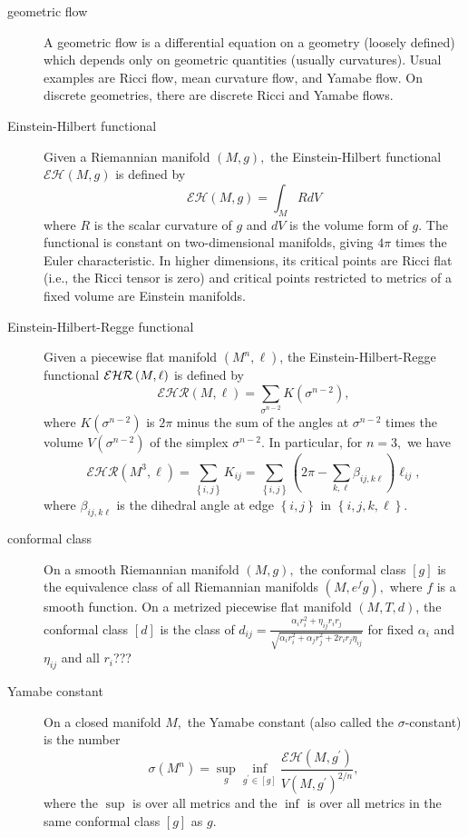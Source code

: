 \begin{description}
\item[geometric flow] A geometric flow is a differential equation on a
geometry (loosely defined) which depends only on geometric quantities
(usually curvatures). Usual examples are Ricci flow, mean curvature flow,
and Yamabe flow. On discrete geometries, there are discrete Ricci and Yamabe
flows.

\item[Einstein-Hilbert functional] Given a Riemannian manifold $\left(
M,g\right) ,$ the Einstein-Hilbert functional $\mathcal{EH}\left( M,g\right) 
$ is defined by 
\[
\mathcal{EH}\left( M,g\right) =\int_{M}RdV 
\]%
where $R$ is the scalar curvature of $g$ and $dV$ is the volume form of $g.$
The functional is constant on two-dimensional manifolds, giving $4\pi $
times the Euler characteristic. In higher dimensions, its critical points
are Ricci flat (i.e., the Ricci tensor is zero) and critical points
restricted to metrics of a fixed volume are Einstein manifolds.

\item[Einstein-Hilbert-Regge functional] Given a piecewise flat manifold $%
\left( M^{n},\ell \right) $, the Einstein-Hilbert-Regge functional $\mathcal{%
EHR}\left( M,\ell \right) $ is defined by 
\[
\mathcal{EHR}\left( M,\ell \right) =\sum_{\sigma ^{n-2}}K\left( \sigma
^{n-2}\right) , 
\]%
where $K\left( \sigma ^{n-2}\right) $ is $2\pi $ minus the sum of the angles
at $\sigma ^{n-2}$ times the volume $V\left( \sigma ^{n-2}\right) $ of the
simplex $\sigma ^{n-2}.$ In particular, for $n=3,$ we have 
\[
\mathcal{EHR}\left( M^{3},\ell \right) =\sum_{\left\{ i,j\right\}
}K_{ij}=\sum_{\left\{ i,j\right\} }\left( 2\pi -\sum_{k,\ell }\beta
_{ij,k\ell }\right) \ell _{ij}, 
\]%
where $\beta _{ij,k\ell }$ is the dihedral angle at edge $\left\{
i,j\right\} $ in $\left\{ i,j,k,\ell \right\} .$

\item[conformal class] On a smooth Riemannian manifold $\left( M,g\right) ,$
the conformal class $\left[ g\right] $ is the equivalence class of all
Riemannian manifolds $\left( M,e^{f}g\right) ,$ where $f$ is a smooth
function. On a metrized piecewise flat manifold $\left( M,T,d\right) $, the
conformal class $\left[ d\right] $ is the class of $d_{ij}=\frac{\alpha
_{i}r_{i}^{2}+\eta _{ij}r_{i}r_{j}}{\sqrt{\alpha _{i}r_{i}^{2}+\alpha
_{j}r_{j}^{2}+2r_{i}r_{j}\eta _{ij}}}$ for fixed $\alpha _{i}$ and $\eta
_{ij}$ and all $r_{i}$???

\item[Yamabe constant] On a closed manifold $M,$ the Yamabe constant (also
called the $\sigma $-constant) is the number 
\[
\sigma \left( M^{n}\right) =\sup_{g}\inf_{g^{\prime }\in \left[ g\right] }%
\frac{\mathcal{EH}\left( M,g^{\prime }\right) }{V\left( M,g^{\prime }\right)
^{2/n}}, 
\]%
where the $\sup $ is over all metrics and the $\inf $ is over all metrics in
the same conformal class $\left[ g\right] $ as $g.$


\end{description}
